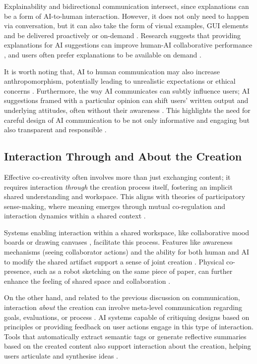 Explainability and bidirectional communication intersect, since explanations can be a form of AI-to-human interaction. However, it does not only need to happen via conversation, but it can also take the form of visual examples, GUI elements and be delivered proactively or on-demand \cite{Zhu2018-zd}. Research suggests that providing explanations for AI suggestions can improve human-AI collaborative performance \cite{Vaccaro2024-ne}, and users often prefer explanations to be available on demand \cite{Oh2018-mu}.

It is worth noting that, AI to human communication may also increase anthropomorphism, potentially leading to unrealistic expectations or ethical concerns \cite{Rezwana2023-gj, Rezwana2022-ui}. Furthermore, the way AI communicates can subtly influence users; AI suggestions framed with a particular opinion can shift users' written output and underlying attitudes, often without their awareness \cite{Jakesch2023-ks}. This highlights the need for careful design of AI communication to be not only informative and engaging but also transparent and responsible \cite{Jakesch2023-ks, El-Assady2022-qc}.

\subsection{Interaction Through and About the Creation}

Effective co-creativity often involves more than just exchanging content; it requires interaction \textit{through} the creation process itself, fostering an implicit shared understanding and workspace. This aligns with theories of participatory sense-making, where meaning emerges through mutual co-regulation and interaction dynamics within a shared context \cite{Davis2016-te}.

Systems enabling interaction within a shared workspace, like collaborative mood boards \cite{Koch2020-gx} or drawing canvases \cite{Davis2016-te, Lawton2023-tb}, facilitate this process. Features like awareness mechanisms (seeing collaborator actions) \cite{Koch2020-gx} and the ability for both human and AI to modify the shared artifact support a sense of joint creation \cite{Lawton2023-tb}. Physical co-presence, such as a robot sketching on the same piece of paper, can further enhance the feeling of shared space and collaboration \cite{Lin2020-ji}.

On the other hand, and related to the previous discussion on communication, interaction \textit{about} the creation can involve meta-level communication regarding goals, evaluations, or process \cite{Rezwana2022-gg, Bown2020-oc}. AI systems capable of critiquing designs based on principles \cite{Zhou2024-vp} or providing feedback on user actions \cite{Davis2016-te} engage in this type of interaction. Tools that automatically extract semantic tags or generate reflective summaries based on the created content also support interaction about the creation, helping users articulate and synthesise ideas \cite{Koch2020-gx}.

